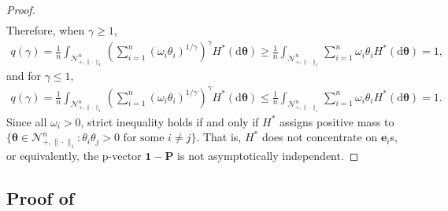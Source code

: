 \documentclass[12pt]{article}
\theoremstyle{plain}
\theoremstyle{plain}
\theoremstyle{definition}
\newcommand{\intd}{\mathrm{d}}
\newcommand{\punitsphereone}[1]{\mathcal{N}_{+,\|\cdot\|_1}^{#1}}
\begin{document}
\begin{proof}
\begin{align*}
\end{align*}
Therefore, when $\gamma \ge 1$,
\begin{align*} 
q(\gamma)
=\frac{1}{n}\int_{\punitsphereone{n}}\left(\sum_{i=1}^n(\omega_i\theta_i)^{1/\gamma}\right)^\gamma H^*(\mathrm{d}\bm{\theta})
\ge \frac{1}{n}\int_{\punitsphereone{n}}\sum_{i=1}^n \omega_i \theta_i H^*(\intd\bm{\theta})
= 1 ,
\end{align*}
and for $\gamma\le 1$,
\begin{align*} 
q(\gamma)
=\frac{1}{n}\int_{\punitsphereone{n}}\left(\sum_{i=1}^n(\omega_i\theta_i)^{1/\gamma}\right)^\gamma H^*(\mathrm{d}\bm{\theta})
\le \frac{1}{n}\int_{\punitsphereone{n}}\sum_{i=1}^n \omega_i \theta_i H^*(\intd\bm{\theta})
= 1.
\end{align*}
Since all \(\omega_i>0\), strict inequality holds if and only if
\(H^*\) assigns positive mass to
$\{\bm{\theta}\in\punitsphereone{n}: \theta_i \theta_j>0  \mbox{~for some~} i\neq j\}$.
That is, $H^*$ does not concentrate on $\mathbf{e}_i$s, or equivalently, the p-vector $\mathbf{1}-\mathbf{P}$ is not asymptotically independent.
\end{proof}







\subsection{Proof of }

\ValidCauchy*
\end{document}
